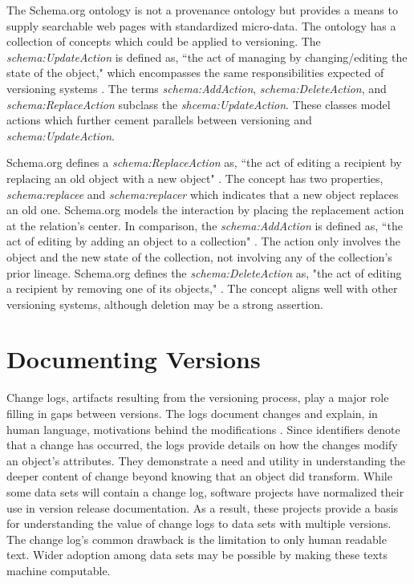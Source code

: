 \sloppy
The Schema.org ontology is not a provenance ontology but provides a means to supply searchable web pages with standardized micro-data.
The ontology has a collection of concepts which could be applied to versioning.
The \textit{schema:UpdateAction} is defined as, ``the act of managing by changing/editing the state of the object," which encompasses the same responsibilities expected of versioning systems \cite{Schema}.
The terms \textit{schema:AddAction}, \textit{schema:DeleteAction}, and \textit{schema:ReplaceAction} subclass the \textit{shcema:UpdateAction}.
These classes model actions which further cement parallels between versioning and \textit{schema:UpdateAction}.

\fussy
Schema.org defines a \textit{schema:ReplaceAction} as, ``the act of editing a recipient by replacing an old object with a new object" \cite{SchemaRep}.
The concept has two properties, \textit{schema:replacee} and \textit{schema:replacer} which indicates that a new object replaces an old one.
Schema.org models the interaction by placing the replacement action at the relation's center.
In comparison, the \textit{schema:AddAction} is defined as, ``the act of editing by adding an object to a collection" \cite{SchemaAdd}.
The action only involves the object and the new state of the collection, not involving any of the collection's prior lineage.
Schema.org defines the \textit{schema:DeleteAction} as, "the act of editing a recipient by removing one of its objects," \cite{SchemaRem}.
The concept aligns well with other versioning systems, although deletion may be a strong assertion.

\section{Documenting Versions} \label{sec:changelog}

Change logs, artifacts resulting from the versioning process, play a major role filling in gaps between versions.
The logs document changes and explain, in human language, motivations behind the modifications \cite{uel1037}.
Since identifiers denote that a change has occurred, the logs provide details on how the changes modify an object's attributes.
They demonstrate a need and utility in understanding the deeper content of change beyond knowing that an object did transform.
While some data sets will contain a change log, software projects have normalized their use in version release documentation.
As a result, these projects provide a basis for understanding the value of change logs to data sets with multiple versions.
The change log's common drawback is the limitation to only human readable text.
Wider adoption among data sets may be possible by making these texts machine computable.


